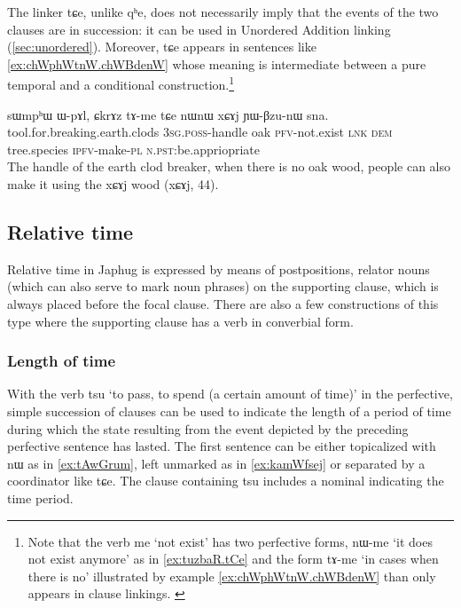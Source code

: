 \documentclass[oldfontcommands,oneside,a4paper,11pt]{article}
\newcommand{\ipa}[1]{{\phon \mbox{#1}}} %
\begin{document}
 The linker \ipa{tɕe}, unlike \ipa{qʰe},  does not necessarily imply that the events of the two clauses are in succession: it can be used in Unordered Addition linking (\ref{sec:unordered}). Moreover,  \ipa{tɕe}  appears in sentences like \ref{ex:chWphWtnW.chWBdenW} whose meaning is intermediate between a pure temporal and a conditional construction.\footnote{Note that the verb \ipa{me} `not exist' has two perfective forms,  \ipa{nɯ-me} `it does not exist anymore' as in \ref{ex:tuzbaR.tCe} and the   form \ipa{tɤ-me} `in cases when there is no' illustrated by example \ref{ex:chWphWtnW.chWBdenW} than only appears in clause linkings. \label{ft:tAme}}

\begin{exe}
\ex \label{ex:chWphWtnW.chWBdenW}
\gll 
   	\ipa{sɯmpʰɯ}  	\ipa{ɯ-pɤl,}  	\ipa{ɕkrɤz}  	\ipa{tɤ-me}  	\ipa{tɕe}  	\ipa{nɯnɯ}  	\ipa{xɕɤj}  	\ipa{ɲɯ-βzu-nɯ}  	\ipa{sna.}  \\
   	tool.for.breaking.earth.clods \textsc{3sg.poss}-handle oak \textsc{pfv}-not.exist \textsc{lnk} \textsc{dem} tree.species \textsc{ipfv}-make-\textsc{pl} \textsc{n.pst}:be.appriopriate \\
\glt The handle of the earth clod breaker, when there is no oak wood, people can also make it using the xɕɤj wood (xɕɤj, 44).
\end{exe}
 
  
\subsection{Relative time} \label{sec:relative.time}
Relative time in Japhug is expressed by means of postpositions, relator nouns (which can also serve to mark noun phrases) on the supporting clause, which is always placed before the focal clause. There are also a few constructions of this type where the supporting clause has a verb in converbial form. 





 \subsubsection{Length of time}
With the verb \ipa{tsu} `to pass, to spend (a certain amount of time)' in the perfective, simple succession of clauses can be used to indicate the length of a period of time during which the state resulting from the event depicted by the preceding perfective sentence has lasted.  The first sentence can be either topicalized with \ipa{nɯ} as in \ref{ex:tAwGrum}, left unmarked as in \ref{ex:kamWfsej} or separated by a coordinator like \ipa{tɕe}. The clause containing \ipa{tsu} includes a nominal indicating the time period.
\end{document}

